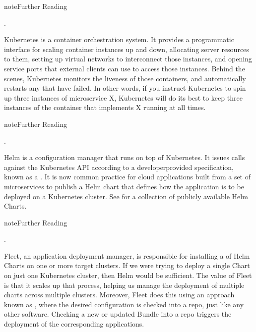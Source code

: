\documentclass[a4paper,11pt,english]{sphinxmanual}
\begin{document}
\label{\detokenize{cloud:reading-docker}}
\begin{sphinxadmonition}{note}{Further Reading}

\sphinxAtStartPar
{}.
\end{sphinxadmonition}

\sphinxAtStartPar
Kubernetes is a container orchestration system. It provides a
programmatic interface for scaling container instances up and down,
allocating server resources to them, setting up virtual networks to
interconnect those instances, and opening service ports that external
clients can use to access those instances. Behind the scenes,
Kubernetes monitors the liveness of those containers, and
automatically restarts any that have failed. In other words, if you
instruct Kubernetes to spin up three instances of microservice X,
Kubernetes will do its best to keep three instances of the container
that implements X running at all times.

\label{\detokenize{cloud:reading-k8s}}
\begin{sphinxadmonition}{note}{Further Reading}

\sphinxAtStartPar
{}.
\end{sphinxadmonition}

\sphinxAtStartPar
Helm is a configuration manager that runs on top of Kubernetes. It
issues calls against the Kubernetes API according to a
developer\sphinxhyphen{}provided specification, known as a . It is now
common practice for cloud applications built from a set of
microservices to publish a Helm chart that defines how the application
is to be deployed on a Kubernetes cluster. See
 for a collection of publicly available
Helm Charts.

\label{\detokenize{cloud:reading-helm}}
\begin{sphinxadmonition}{note}{Further Reading}

\sphinxAtStartPar
{}.
\end{sphinxadmonition}

\sphinxAtStartPar
Fleet, an application deployment manager, is responsible for
installing a  of Helm Charts on one or more target
clusters. If we were trying to deploy a single Chart on just one
Kubernetes cluster, then Helm would be sufficient. The value of Fleet
is that it scales up that process, helping us manage the deployment of
multiple charts across multiple clusters. Moreover, Fleet does this
using an approach known as , where the desired
configuration is checked into a repo, just like any other
software. Checking a new or updated Bundle into a repo
triggers the deployment of the corresponding applications.
\end{document}
